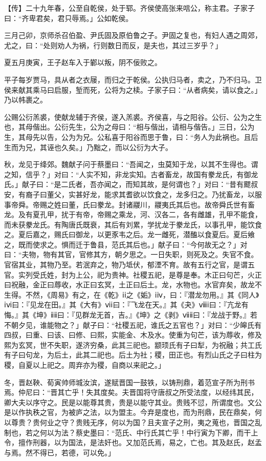 \documentclass[]{article}
\begin{document}
【传】二十九年春，公至自乾侯，处于郓。齐侯使高张来唁公，称主君。子家子曰：``齐卑君矣，君只辱焉。」公如乾侯。

三月己卯，京师杀召伯盈、尹氏固及原伯鲁之子。尹固之复也，有妇人遇之周郊，尤之，曰：``处则劝人为祸，行则数日而反，是夫也，其过三岁乎？」

夏五月庚寅，王子赵车入于鄻以叛，阴不佞败之。

平子每岁贾马，具从者之衣屦，而归之于乾侯。公执归马者，卖之，乃不归马。卫侯来献其乘马曰启服，堑而死，公将为之椟。子家子曰：``从者病矣，请以食之。」乃以帏裹之。

公赐公衍羔裘，使献龙辅于齐侯，遂入羔裘。齐侯喜，与之阳谷。公衍、公为之生也，其母偕出。公衍先生，公为之母曰：``相与偕出，请相与偕告。」三日，公为生，其母先以告，公为为兄。公私喜于阳谷而思于鲁，曰：``务人为此祸也。且后生而为兄，其诬也久矣。」乃黜之，而以公衍为大子。

秋，龙见于绛郊。魏献子问于蔡墨曰：``吾闻之，虫莫知于龙，以其不生得也。谓之知，信乎？」对曰：``人实不知，非龙实知。古者畜龙，故国有豢龙氏，有御龙氏。」献子曰：``是二氏者，吾亦闻之，而知其故，是何谓也？」对曰：``昔有飂叔安，有裔子曰董父，实甚好龙，能求其耆欲以饮食之，龙多归之。乃扰畜龙，以服事帝舜。帝赐之姓曰董，氏曰豢龙。封诸鬷川，鬷夷氏其后也。故帝舜氏世有畜龙。及有夏孔甲，扰于有帝，帝赐之乘龙，河、汉各二，各有雌雄，孔甲不能食，而未获豢龙氏。有陶唐氏既衰，其后有刘累，学扰龙于豢龙氏，以事孔甲，能饮食之。夏后嘉之，赐氏曰御龙，以更豕韦之后。龙一雌死，潜醢以食夏后。夏后飨之，既而使求之。惧而迁于鲁县，范氏其后也。」献子曰：``今何故无之？」对曰：``夫物，物有其官，官修其方，朝夕思之。一日失职，则死及之。失官不食。官宿其业，其物乃至。若泯弃之，物乃坻伏，郁湮不育。故有五行之官，是谓五官。实列受氏姓，封为上公，祀为贵神。社稷五祀，是尊是奉。木正曰句芒，火正曰祝融，金正曰蓐收，水正曰玄冥，土正曰后土。龙，水物也。水官弃矣，故龙不生得。不然，《周易》有之，在《乾》ⅰⅰ之《姤》ⅰⅳ，曰：『潜龙勿用。』其《同人》ⅰⅵ曰：『见龙在田。』其《大有》ⅵⅰ曰：『飞龙在天。』其《夬》ⅷⅰ曰：『亢龙有悔。』其《坤》ⅱⅱ曰：『见群龙无首，吉。』《坤》之《剥》ⅶⅱ曰：『龙战于野。』若不朝夕见，谁能物之？」献子曰：``社稷五祀，谁氏之五官也？」对曰：``少皞氏有四叔，曰重、曰该、曰修、曰熙，实能金、木及水。使重为句芒，该为蓐收，修及熙为玄冥，世不失职，遂济穷桑，此其三祀也。颛顼氏有子曰犁，为祝融；共工氏有子曰句龙，为后土，此其二祀也。后土为社；稷，田正也。有烈山氏之子曰柱为稷，自夏以上祀之。周弃亦为稷，自商以来祀之。」

冬，晋赵鞅、荀寅帅师城汝滨，遂赋晋国一鼓铁，以铸刑鼎，着范宣子所为刑书焉。仲尼曰：``晋其亡乎！失其度矣。夫晋国将守唐叔之所受法度，以经纬其民，卿大夫以序守之。民是以能尊其贵，贵是以能守其业。贵贱不愆，所谓度也。文公是以作执秩之官，为被庐之法，以为盟主。今弃是度也，而为刑鼎，民在鼎矣，何以尊贵？贵何业之守？贵贱无序，何以为国？且夫宣子之刑，夷之蒐也，晋国之乱制也，若之何以为法？蔡史墨曰：``范氏、中行氏其亡乎！中行寅为下卿，而干上令，擅作刑器，以为国法，是法奸也。又加范氏焉，易之，亡也。其及赵氏，赵孟与焉。然不得已，若德，可以免。」
\end{document}
